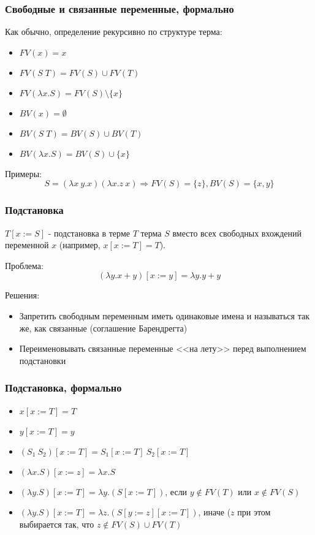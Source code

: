 \documentclass{../../slides-style}
\begin{document}
    \begin{frame}
        \frametitle{Свободные и связанные переменные, формально}
        Как обычно, определение рекурсивно по структуре терма:
        \begin{itemize}
            \item $FV(x) = x$
            \item $FV(S \; T) = FV(S) \cup FV(T)$
            \item $FV(\lambda x.S) = FV(S) \setminus \{x\}$
        \end{itemize}

        \begin{itemize}
            \item $BV(x) = \emptyset$
            \item $BV(S \; T) = BV(S) \cup BV(T)$
            \item $BV(\lambda x.S) = BV(S) \cup \{x\}$
        \end{itemize}
        Примеры:
        $$S = (\lambda x\ y.x) (\lambda x.z\ x) \Rightarrow FV(S) = \{z\}, BV(S) = \{x,y\}$$
    \end{frame}
    
    \begin{frame}
        \frametitle{Подстановка}
        $T[x := S]$ - подстановка в терме $T$ терма $S$ вместо всех свободных вхождений 
        переменной $x$ (например, $x[x := T] = T$).
        
        Проблема:
        $$(\lambda y.x + y)[x := y] = \lambda y. y + y$$
        
        Решения:
        \begin{itemize}
            \item Запретить свободным переменным иметь одинаковые имена и называться так же, 
                    как связанные (соглашение Барендрегта)
            \item Переименовывать связанные переменные <<на лету>> перед выполнением подстановки
        \end{itemize}
    \end{frame}
    
    \begin{frame}
        \frametitle{Подстановка, формально}
        \begin{itemize}
            \item $x[x := T] = T$
            \item $y[x := T] = y$
            \item $(S_1\ S_2)[x := T] = S_1[x := T]\ S_2[x := T]$
            \item $(\lambda x.S)[x := z] = \lambda x.S$
            \item $(\lambda y.S)[x := T] = \lambda y.(S[x := T])$, если $y \notin FV(T)$ или $x \notin FV(S)$
            \item $(\lambda y.S)[x := T] = \lambda z.(S[y := z][x := T])$, иначе ($z$ при этом выбирается так, 
                    что $z \notin FV(S) \cup FV(T)$
        \end{itemize}
    \end{frame}
        
\end{document}

